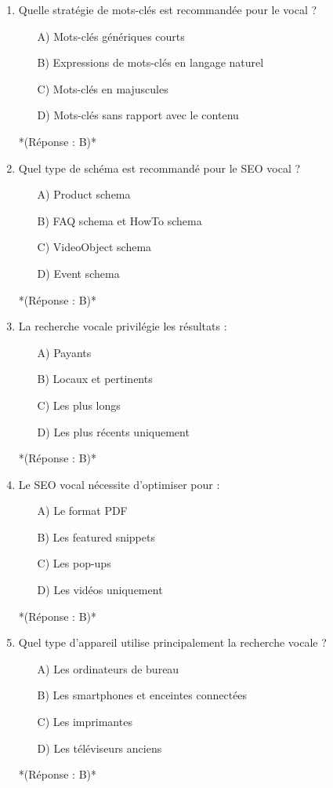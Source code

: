 \documentclass[12pt,a4paper,twoside]{report}
\begin{document}
\begin{enumerate}
    \item Quelle stratégie de mots-clés est recommandée pour le vocal ?
    \begin{itemize}
        \item[A)] Mots-clés génériques courts
        \item[B)] Expressions de mots-clés en langage naturel
        \item[C)] Mots-clés en majuscules
        \item[D)] Mots-clés sans rapport avec le contenu
    \end{itemize}
    *(Réponse : B)*

    \item Quel type de schéma est recommandé pour le SEO vocal ?
    \begin{itemize}
        \item[A)] Product schema
        \item[B)] FAQ schema et HowTo schema
        \item[C)] VideoObject schema
        \item[D)] Event schema
    \end{itemize}
    *(Réponse : B)*

    \item La recherche vocale privilégie les résultats :
    \begin{itemize}
        \item[A)] Payants
        \item[B)] Locaux et pertinents
        \item[C)] Les plus longs
        \item[D)] Les plus récents uniquement
    \end{itemize}
    *(Réponse : B)*

    \item Le SEO vocal nécessite d'optimiser pour :
    \begin{itemize}
        \item[A)] Le format PDF
        \item[B)] Les featured snippets
        \item[C)] Les pop-ups
        \item[D)] Les vidéos uniquement
    \end{itemize}
    *(Réponse : B)*

    \item Quel type d'appareil utilise principalement la recherche vocale ?
    \begin{itemize}
        \item[A)] Les ordinateurs de bureau
        \item[B)] Les smartphones et enceintes connectées
        \item[C)] Les imprimantes
        \item[D)] Les téléviseurs anciens
    \end{itemize}
    *(Réponse : B)*


\end{enumerate}
\end{document}
